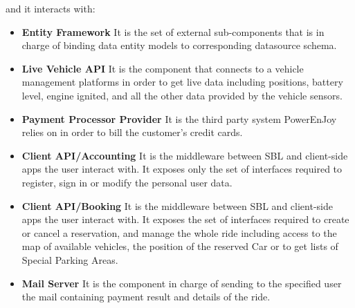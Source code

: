 and it interacts with:
\begin{itemize}
    \item\textbf{Entity Framework}\newline
    It is the set of external sub-components that is in charge of binding data entity models to corresponding datasource schema.
    \item\textbf{Live Vehicle API}\newline
    It is the component that connects to a vehicle management platforms in order to get live data including positions, battery level, engine ignited, and all the other data provided by the vehicle sensors.
    \item\textbf{Payment Processor Provider}\newline
    It is the third party system PowerEnJoy relies on in order to bill the customer's credit cards.
    \item\textbf{Client API/Accounting}\newline
    It is the middleware between SBL and client-side apps the user interact with. It exposes only the set of interfaces required to register, sign in or modify the personal user data.
    \item\textbf{Client API/Booking}\newline
    It is the middleware between SBL and client-side apps the user interact with. It exposes the set of interfaces required to create or cancel a reservation, and manage the whole ride including access to the map of available vehicles, the position of the reserved Car or to get lists of Special Parking Areas.
    \item\textbf{Mail Server}\newline
    It is the component in charge of sending to the specified user the mail containing payment result and details of the ride.
\end{itemize}

